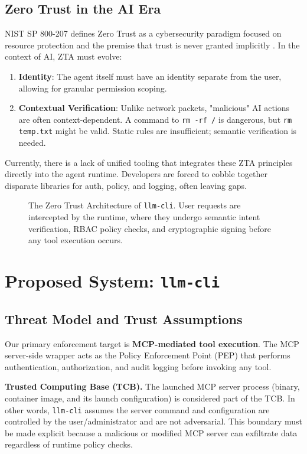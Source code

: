 \documentclass[conference]{IEEEtran}
\begin{document}
\subsection{Zero Trust in the AI Era}
NIST SP 800-207 defines Zero Trust as a cybersecurity paradigm focused on resource protection and the premise that trust is never granted implicitly \cite{nist}. In the context of AI, ZTA must evolve:
\begin{enumerate}
    \item \textbf{Identity}: The agent itself must have an identity separate from the user, allowing for granular permission scoping.
    \item \textbf{Contextual Verification}: Unlike network packets, "malicious" AI actions are often context-dependent. A command to \texttt{rm -rf /} is dangerous, but \texttt{rm temp.txt} might be valid. Static rules are insufficient; semantic verification is needed.
\end{enumerate}

Currently, there is a lack of unified tooling that integrates these ZTA principles directly into the agent runtime. Developers are forced to cobble together disparate libraries for auth, policy, and logging, often leaving gaps.

\begin{figure}[t!]
\centering

\caption{The Zero Trust Architecture of \texttt{llm-cli}. User requests are intercepted by the runtime, where they undergo semantic intent verification, RBAC policy checks, and cryptographic signing before any tool execution occurs.}
\label{fig:arch}
\end{figure}

\section{Proposed System: \texttt{llm-cli}}
\subsection{Threat Model and Trust Assumptions}
Our primary enforcement target is \textbf{MCP-mediated tool execution}. The MCP server-side wrapper acts as the Policy Enforcement Point (PEP) that performs authentication, authorization, and audit logging before invoking any tool.

\textbf{Trusted Computing Base (TCB).} The launched MCP server process (binary, container image, and its launch configuration) is considered part of the TCB. In other words, \texttt{llm-cli} assumes the server command and configuration are controlled by the user/administrator and are not adversarial. This boundary must be made explicit because a malicious or modified MCP server can exfiltrate data regardless of runtime policy checks.
\end{document}
